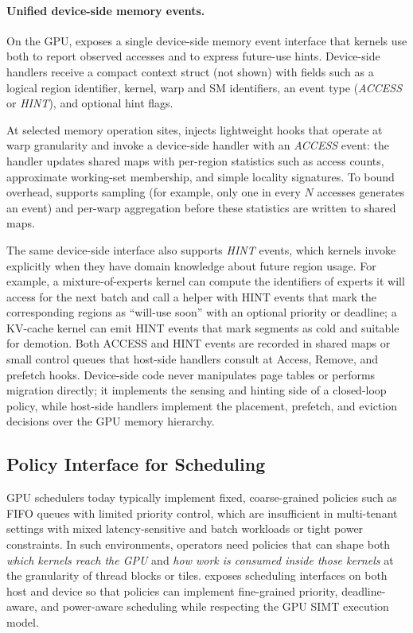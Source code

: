 \paragraph{Unified device-side memory events.}
On the GPU, \sys exposes a single device-side memory event interface that kernels
use both to report observed accesses and to express future-use hints. Device-side
handlers receive a compact context struct (not shown) with fields such as a logical
region identifier, kernel, warp and SM identifiers, an event type (\emph{ACCESS}
or \emph{HINT}), and optional hint flags.

At selected memory operation sites, \sys injects lightweight hooks that operate at
warp granularity and invoke a device-side \sys handler with an \emph{ACCESS} event:
the handler updates shared maps with per-region statistics such as access counts,
approximate working-set membership, and simple locality signatures. To bound
overhead, \sys supports sampling (for example, only one in every $N$ accesses
generates an event) and per-warp aggregation before these statistics are written
to shared maps.

The same device-side interface also supports \emph{HINT} events, which kernels
invoke explicitly when they have domain knowledge about future region usage. For
example, a mixture-of-experts kernel can compute the identifiers of experts it
will access for the next batch and call a \sys helper with HINT events that mark
the corresponding regions as “will-use soon” with an optional priority or deadline;
a KV-cache kernel can emit HINT events that mark segments as cold and suitable for
demotion. Both ACCESS and HINT events are recorded in shared maps or small control
queues that host-side \sys handlers consult at Access, Remove, and prefetch hooks.
Device-side code never manipulates page tables or performs migration directly; it
implements the sensing and hinting side of a closed-loop policy, while host-side
\sys handlers implement the placement, prefetch, and eviction decisions over the
GPU memory hierarchy.


\subsection{Policy Interface for Scheduling}
\label{sec:design-sched}

GPU schedulers today typically implement fixed, coarse-grained policies such as FIFO
queues with limited priority control, which are insufficient in multi-tenant settings
with mixed latency-sensitive and batch workloads or tight power constraints. In such
environments, operators need policies that can shape both \emph{which kernels reach
the GPU} and \emph{how work is consumed inside those kernels} at the granularity of
thread blocks or tiles. \sys exposes scheduling interfaces on both host and device
so that policies can implement fine-grained priority, deadline-aware, and power-aware
scheduling while respecting the GPU SIMT execution model.

